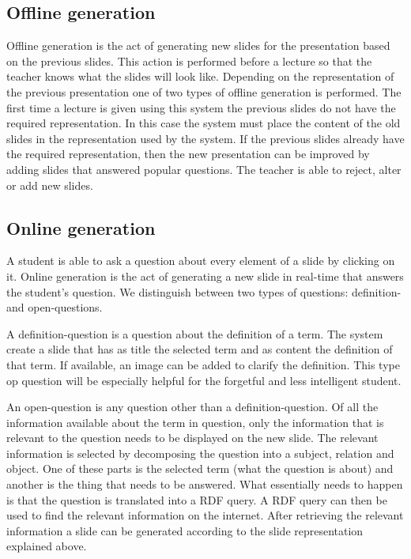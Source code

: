 \documentclass[11pt]{article}
\begin{document}
\subsection{Offline generation}
\label{offlineGeneration}
Offline generation is the act of generating new slides for the presentation based on the previous slides. This action is performed before a lecture so that the teacher knows what the slides will look like. Depending on the representation of the previous presentation one of two types of offline generation is performed. The first time a lecture is given using this system the previous slides do not have the required representation. In this case the system must place the content of the old slides in the representation used by the system. If the previous slides already have the required representation, then the new presentation can be improved by adding slides that answered popular questions. The teacher is able to reject, alter or add new slides.

\subsection{Online generation}
A student is able to ask a question about every element of a slide by clicking on it. Online generation is the act of generating a new slide in real-time that answers the student's question. We distinguish between two types of questions: definition- and open-questions. 

A definition-question is a question about the definition of a term. The system create a slide that has as title the selected term and as content the definition of that term. If available, an image can be added to clarify the definition. This type op question will be especially helpful for the forgetful and less intelligent student. 

An open-question is any question other than a definition-question. Of all the information available about the term in question, only the information that is relevant to the question needs to be displayed on the new slide. The relevant information is selected by decomposing the question into a subject, relation and object. One of these parts is the selected term (what the question is about) and another is the thing that needs to be answered. What essentially needs to happen is that the question is translated into a RDF query. A RDF query can then be used to find the relevant information on the internet. After retrieving the relevant information a slide can be generated according to the slide representation explained above.
\end{document}
